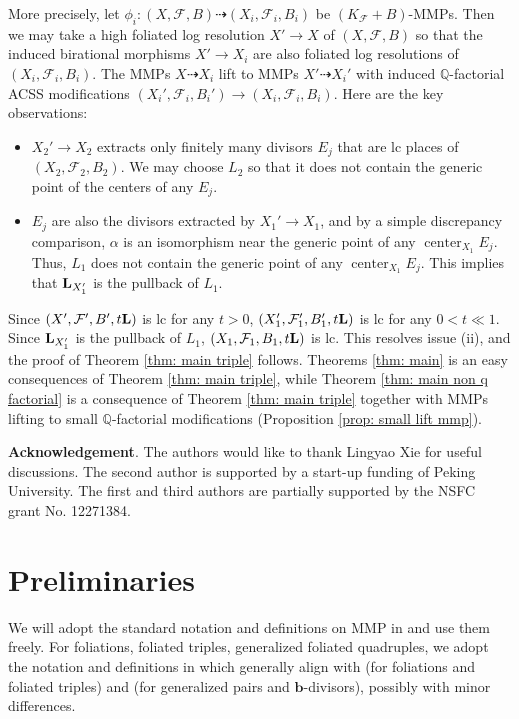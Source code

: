 \documentclass[11pt]{amsart}
\numberwithin{equation}{section}
\newcommand{\bb}{\bm{b}}
\newcommand{\Qq}{\mathbb{Q}}
\newcommand{\Center}{\operatorname{center}}
\newcommand{\Ff}{\mathcal{F}}
\newcommand{\Ll}{{\bf{L}}}
\theoremstyle{definition}
\theoremstyle{definition}
\theoremstyle{definition}
\begin{document}
More precisely, let $\phi_i: (X,\Ff,B)\dashrightarrow (X_i,\Ff_i,B_i)$ be $(K_{\Ff}+B)$-MMPs. Then we may take a high foliated log resolution $X'\rightarrow X$ of $(X,\Ff,B)$ so that the induced birational morphisms $X'\rightarrow X_i$ are also foliated log resolutions of $(X_i,\Ff_i,B_i)$. The MMPs $X\dashrightarrow X_i$ lift to MMPs $X'\dashrightarrow X_i'$ with induced $\Qq$-factorial ACSS modifications $(X_i',\Ff_i,B_i')\rightarrow (X_i,\Ff_i,B_i)$. Here are the key observations: \begin{itemize} \item $X_2'\rightarrow X_2$ extracts only finitely many divisors $E_j$ that are lc places of $(X_2,\Ff_2,B_2)$. We may choose $L_2$ so that it does not contain the generic point of the centers of any $E_j$.
\item $E_j$ are also the divisors extracted by $X_1'\rightarrow X_1$, and by a simple discrepancy comparison, $\alpha$ is an isomorphism near the generic point of any $\Center_{X_1}E_j$. Thus, $L_1$ does not contain the generic point of any $\Center_{X_1}E_j$. This implies that $\Ll_{X_1'}$ is the pullback of $L_1$.
\end{itemize}
Since $(X',\Ff',B',t\Ll)$ is lc for any $t>0$, $(X_1',\Ff_1',B_1',t\Ll)$ is lc for any $0<t\ll 1$. Since $\Ll_{X_1'}$ is the pullback of $L_1$, $(X_1,\Ff_1,B_1,t\Ll)$ is lc. This resolves issue (ii), and the proof of Theorem \ref{thm: main triple} follows. Theorems \ref{thm: main} is an easy consequences of Theorem \ref{thm: main triple}, while Theorem \ref{thm: main non q factorial} is a consequence of  Theorem \ref{thm: main triple} together with MMPs lifting to small $\Qq$-factorial modifications (Proposition \ref{prop: small lift mmp}).



\medskip

\noindent\textbf{Acknowledgement}. The authors would like to thank Lingyao Xie for useful discussions. The second author is supported by a start-up funding of Peking University. The first and third authors are partially supported by the NSFC grant No. 12271384.

\section{Preliminaries}\label{sec: preliminaries}

We will adopt the standard notation and definitions on MMP in \cite{KM98,BCHM10} and use them freely. For foliations, foliated triples, generalized foliated quadruples, we adopt the notation and definitions in \cite{LLM23,CHLX23} which generally align with \cite{CS20, ACSS21, CS21} (for foliations and foliated triples) and \cite{BZ16,HL23} (for generalized pairs and $\bb$-divisors), possibly with minor differences. 
\end{document}
